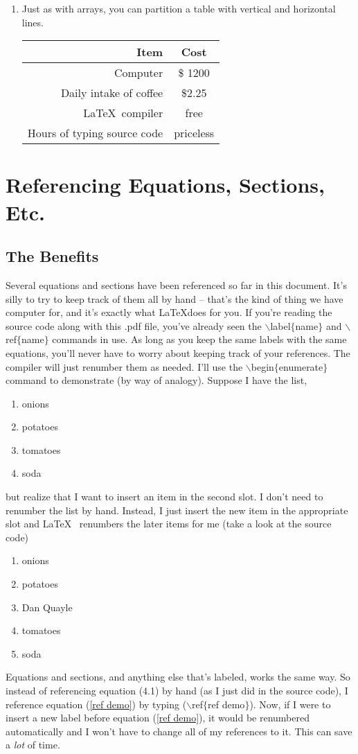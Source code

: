 \documentclass[12pt]{report} %
\newcommand{\be}{\begin{enumerate}} %
\newcommand{\ee}{\end{enumerate}}	%
\begin{document}
\begin{enumerate}
\item Just as with arrays, you can partition a table with vertical and horizontal lines.
\begin{center}
\begin{tabular}{|r|c|}
\hline
{\bf Item} & {\bf Cost} \\
\hline
\hline
Computer & \$ 1200 \\
\hline 
Daily intake of coffee & \$2.25 \\
\hline
\LaTeX~compiler & free \\
\hline
Hours of typing source code & priceless\\
\hline
\end{tabular}
\end{center}

\end{enumerate} %

\setcounter{chapter}{5}
\section{Referencing Equations, Sections, Etc.}
\subsection{The Benefits}

Several equations and sections have been referenced so far in this document.  It's 
silly to try to keep track of them all by hand -- that's the kind of thing we have 
computer for, and it's exactly what \LaTeX does for you.  If you're reading the 
source code along with this .pdf file, you've already seen the 
$\backslash$label$\{$name$\}$ and $\backslash$ref$\{$name$\}$ commands in 
use.  As long as you keep the same labels with the same equations, you'll never 
have to worry about keeping track of your references.  The compiler will just 
renumber them as needed.  I'll use the $\backslash$begin$\{$enumerate$\}$ 
command to demonstrate (by way of analogy).  Suppose I have the list,
\be
\item onions
\item potatoes
\item tomatoes
\item soda
\ee
but realize that I want to insert an item in the second slot.  I don't need to 
renumber the list by hand.  Instead, I just insert the new item in the appropriate 
slot and \LaTeX~ renumbers the later items for me (take a look at the source code)
\be
\item onions
\item potatoes
\item Dan Quayle
\item tomatoes
\item soda
\ee
Equations and sections, and anything else that's labeled, works the same way.  So 
instead of referencing equation (4.1) by hand (as I just did in the source code), I 
reference equation (\ref{ref demo}) by typing ($\backslash$ref$\{$ref demo$\}$).  
Now, if I were to insert a new label before equation (\ref{ref demo}), it would be 
renumbered automatically and I won't have to change all of my references to it.  
This can save a {\it lot} of time.
\end{document}
